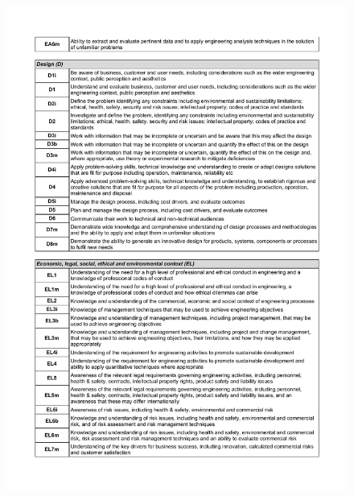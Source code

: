 \newpage
\begin{figure}
	\centering
	\includegraphics[height=\textheight]{Appendices/ECLO2.pdf}
\end{figure}



